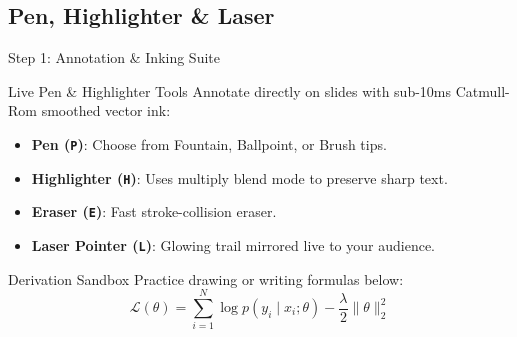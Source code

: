 \documentclass[aspectratio=43]{beamer}
\begin{document}
\subsection{Pen, Highlighter \& Laser}
\begin{frame}{Step 1: Annotation \& Inking Suite}
  \begin{block}{Live Pen \& Highlighter Tools}
    Annotate directly on slides with sub-10ms Catmull-Rom smoothed vector ink:
    \begin{itemize}
      \item \textbf{Pen (\texttt{P})}: Choose from Fountain, Ballpoint, or Brush tips.
      \item \textbf{Highlighter (\texttt{H})}: Uses multiply blend mode to preserve sharp text.
      \item \textbf{Eraser (\texttt{E})}: Fast stroke-collision eraser.
      \item \textbf{Laser Pointer (\texttt{L})}: Glowing trail mirrored live to your audience.
    \end{itemize}
  \end{block}

  \begin{exampleblock}{Derivation Sandbox}
    Practice drawing or writing formulas below:
    \begin{equation}
      \mathcal{L}(\theta) = \sum_{i=1}^N \log p(y_i \mid x_i; \theta) - \frac{\lambda}{2}\|\theta\|_2^2
    \end{equation}
  \end{exampleblock}

\end{frame}

\end{document}
